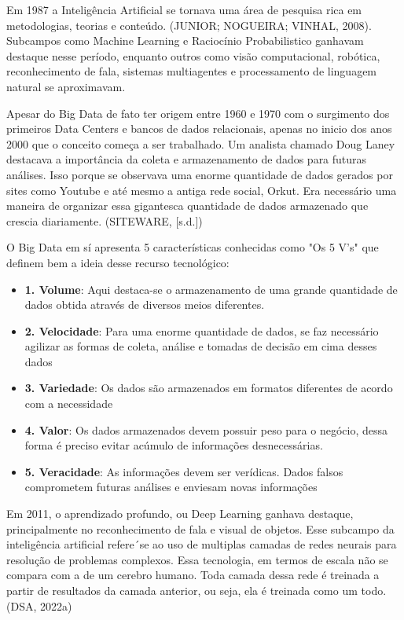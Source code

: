 \documentclass[a4paper,12pt]{article}
\begin{document}
Em 1987 a Inteligência Artificial se tornava uma área de pesquisa rica em metodologias, teorias e conteúdo. (JUNIOR; NOGUEIRA; VINHAL, 2008). Subcampos como Machine Learning e Raciocínio Probabilistico ganhavam destaque nesse período, enquanto outros como visão computacional, robótica, reconhecimento de fala, sistemas multiagentes e processamento de linguagem natural se aproximavam. 

Apesar do Big Data de fato ter origem entre 1960 e 1970 com o surgimento dos primeiros Data Centers e bancos de dados relacionais, apenas no inicio dos anos 2000 que o conceito começa a ser trabalhado. Um analista chamado Doug Laney destacava a importância da coleta e armazenamento de dados para futuras análises. Isso porque se observava uma enorme quantidade de dados gerados por sites como Youtube e até mesmo a antiga rede social, Orkut. Era necessário uma maneira de organizar essa gigantesca quantidade de dados armazenado que crescia diariamente. (SITEWARE, [s.d.])

O Big Data em sí apresenta 5 características conhecidas como "Os 5 V's" que definem bem a ideia desse recurso tecnológico:

\begin{itemize}
    \item \textbf{1. Volume}: Aqui destaca-se o armazenamento de uma grande quantidade de dados obtida através de diversos meios diferentes.

    \item \textbf{2. Velocidade}: Para uma enorme quantidade de dados, se faz necessário agilizar as formas de coleta, análise e tomadas de decisão em cima desses dados

    \item \textbf{3. Variedade}: Os dados são armazenados em formatos diferentes de acordo com a necessidade

    \item \textbf{4. Valor}: Os dados armazenados devem possuir peso para o negócio, dessa forma é preciso evitar acúmulo de informações desnecessárias.

    \item \textbf{5. Veracidade}: As informações devem ser verídicas. Dados falsos comprometem futuras análises e enviesam novas informações
\end{itemize}

Em 2011, o aprendizado profundo, ou Deep Learning ganhava destaque, principalmente no reconhecimento de fala e visual de objetos. Esse subcampo da inteligência artificial refere´se ao uso de multiplas camadas de redes neurais para resolução de problemas complexos. Essa tecnologia, em termos de escala não se compara com a de um cerebro humano. Toda camada dessa rede é treinada a partir de resultados da camada anterior, ou seja, ela é treinada como um todo.  (DSA, 2022a)
\end{document}
